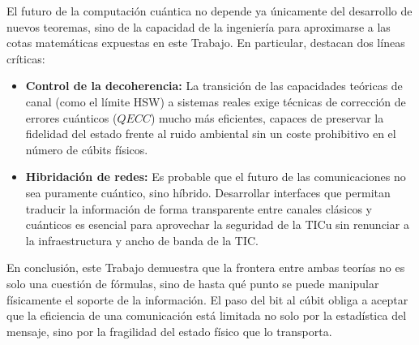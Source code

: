 \documentclass[11pt,a4paper,spanish]{book}
\begin{document}
El futuro de la computación cuántica no depende ya únicamente del desarrollo de nuevos teoremas, sino de la capacidad de la ingeniería para aproximarse a las cotas matemáticas expuestas en este Trabajo. En particular, destacan dos líneas críticas:

\begin{itemize}
    \item \textbf{Control de la decoherencia:} La transición de las capacidades teóricas de canal (como el límite HSW) a sistemas reales exige técnicas de corrección de errores cuánticos ($QECC$) mucho más eficientes, capaces de preservar la fidelidad del estado frente al ruido ambiental sin un coste prohibitivo en el número de cúbits físicos.
    \item \textbf{Hibridación de redes:} Es probable que el futuro de las comunicaciones no sea puramente cuántico, sino híbrido. Desarrollar interfaces que permitan traducir la información de forma transparente entre canales clásicos y cuánticos es esencial para aprovechar la seguridad de la TICu sin renunciar a la infraestructura y ancho de banda de la TIC.
\end{itemize}

En conclusión, este Trabajo demuestra que la frontera entre ambas teorías no es solo una cuestión de fórmulas, sino de hasta qué punto se puede manipular físicamente el soporte de la información. El paso del bit al cúbit obliga a aceptar que la eficiencia de una comunicación está limitada no solo por la estadística del mensaje, sino por la fragilidad del estado físico que lo transporta.
\end{document}
